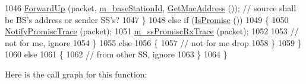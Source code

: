 \begin{DoxyCode}
1046           \hyperlink{classns3_1_1WimaxNetDevice_ae6d708e65981c36d43f075527b11eb8d}{ForwardUp} (packet, \hyperlink{classns3_1_1SubscriberStationNetDevice_a9745729222112443a4b527f681537c48}{m\_baseStationId}, 
      \hyperlink{classns3_1_1WimaxNetDevice_aa02eb7f6de9c03f0b8f2e33e3c5b5559}{GetMacAddress} ()); \textcolor{comment}{// source shall be BS's address or sender SS's?}
1047         \}
1048       \textcolor{keywordflow}{else} \textcolor{keywordflow}{if} (\hyperlink{classns3_1_1WimaxNetDevice_a723428fe404a97984ad511200ac124cb}{IsPromisc} ())
1049         \{
1050           \hyperlink{classns3_1_1WimaxNetDevice_ae4b47a15b76b910b8e91e70f1afd6fbc}{NotifyPromiscTrace} (packet);
1051           \hyperlink{classns3_1_1SubscriberStationNetDevice_a2c670d0f51aa369b4e786c8112b2f7ea}{m\_ssPromiscRxTrace} (packet);
1052 
1053           \textcolor{comment}{// not for me, ignore}
1054         \}
1055       \textcolor{keywordflow}{else}
1056         \{
1057           \textcolor{comment}{// not for me drop}
1058         \}
1059     \}
1060   \textcolor{keywordflow}{else}
1061     \{
1062       \textcolor{comment}{// from other SS, ignore}
1063     \}
1064 \}
\end{DoxyCode}


Here is the call graph for this function\+:


